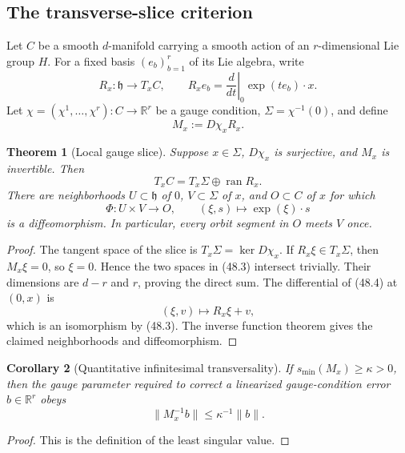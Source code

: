 \documentclass[11pt]{article}
\newtheorem{theorem}{Theorem}[section]
\newtheorem{corollary}[theorem]{Corollary}
\begin{document}
\subsection{The transverse-slice criterion}

Let \(C\) be a smooth \(d\)-manifold carrying a smooth action of an
\(r\)-dimensional Lie group \(H\).  For a fixed basis
\((e_b)_{b=1}^r\) of its Lie algebra, write
\[
 R_x:\mathfrak h\to T_xC,\qquad
 R_xe_b=\left.\frac{d}{dt}\right|_{0}\exp(te_b)\cdot x.        \tag{48.1}
\]
Let \(\chi=(\chi^1,\ldots,\chi^r):C\to\mathbb R^r\) be a gauge
condition, \(\Sigma=\chi^{-1}(0)\), and define
\[
                         M_x:=D\chi_xR_x.                      \tag{48.2}
\]

\begin{theorem}[Local gauge slice]
\label{thm:v11v48-local-slice}
Suppose \(x\in\Sigma\), \(D\chi_x\) is surjective, and \(M_x\) is
invertible.  Then
\[
                   T_xC=T_x\Sigma\oplus\operatorname{ran}R_x. \tag{48.3}
\]
There are neighborhoods \(U\subset\mathfrak h\) of \(0\),
\(V\subset\Sigma\) of \(x\), and \(O\subset C\) of \(x\) for which
\[
                    \Phi:U\times V\to O,\qquad
                    (\xi,s)\mapsto\exp(\xi)\cdot s            \tag{48.4}
\]
is a diffeomorphism.  In particular, every orbit segment in \(O\)
meets \(V\) once.
\end{theorem}

\begin{proof}
The tangent space of the slice is
\(T_x\Sigma=\ker D\chi_x\).  If \(R_x\xi\in T_x\Sigma\), then
\(M_x\xi=0\), so \(\xi=0\).  Hence the two spaces in (48.3) intersect
trivially.  Their dimensions are \(d-r\) and \(r\), proving the direct
sum.  The differential of (48.4) at \((0,x)\) is
\[
                         (\xi,v)\longmapsto R_x\xi+v,          \tag{48.5}
\]
which is an isomorphism by (48.3).  The inverse function theorem gives
the claimed neighborhoods and diffeomorphism.
\end{proof}

\begin{corollary}[Quantitative infinitesimal transversality]
\label{cor:v11v48-transversality}
If \(s_{\min}(M_x)\ge\kappa>0\), then the gauge parameter required to
correct a linearized gauge-condition error \(b\in\mathbb R^r\) obeys
\[
                           \lVert M_x^{-1}b\rVert
                           \le\kappa^{-1}\lVert b\rVert.       \tag{48.6}
\]
\end{corollary}

\begin{proof}
This is the definition of the least singular value.
\end{proof}
\end{document}
